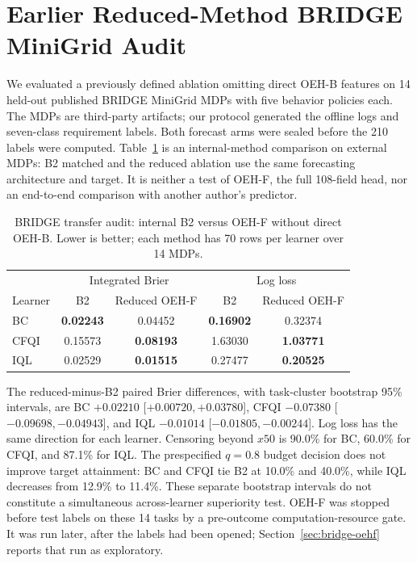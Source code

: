 \section{Earlier Reduced-Method BRIDGE MiniGrid Audit}
We evaluated a previously defined ablation omitting direct OEH-B features on 14 held-out published BRIDGE MiniGrid MDPs with five behavior policies each. The MDPs are third-party artifacts; our protocol generated the offline logs and seven-class requirement labels. Both forecast arms were sealed before the 210 labels were computed. Table~\ref{tab:bridge-reduced} is an internal-method comparison on external MDPs: B2 matched and the reduced ablation use the same forecasting architecture and target. It is neither a test of OEH-F, the full 108-field head, nor an end-to-end comparison with another author's predictor.

\begin{table}[h]
\centering
\caption{BRIDGE transfer audit: internal B2 versus OEH-F without direct OEH-B. Lower is better; each method has 70 rows per learner over 14 MDPs.}
\label{tab:bridge-reduced}
\begin{tabular}{lcccc}
\toprule
& \multicolumn{2}{c}{Integrated Brier} & \multicolumn{2}{c}{Log loss}\\
Learner & B2 & Reduced OEH-F & B2 & Reduced OEH-F\\
\midrule
BC & \textbf{0.02243} & 0.04452 & \textbf{0.16902} & 0.32374\\
CFQI & 0.15573 & \textbf{0.08193} & 1.63030 & \textbf{1.03771}\\
IQL & 0.02529 & \textbf{0.01515} & 0.27477 & \textbf{0.20525}\\
\bottomrule
\end{tabular}
\end{table}

The reduced-minus-B2 paired Brier differences, with task-cluster bootstrap 95\% intervals, are BC $+0.02210$ [$+0.00720,+0.03780$], CFQI $-0.07380$ [$-0.09698,-0.04943$], and IQL $-0.01014$ [$-0.01805,-0.00244$]. Log loss has the same direction for each learner. Censoring beyond $x50$ is 90.0\% for BC, 60.0\% for CFQI, and 87.1\% for IQL. The prespecified $q=0.8$ budget decision does not improve target attainment: BC and CFQI tie B2 at 10.0\% and 40.0\%, while IQL decreases from 12.9\% to 11.4\%. These separate bootstrap intervals do not constitute a simultaneous across-learner superiority test. OEH-F was stopped before test labels on these 14 tasks by a pre-outcome computation-resource gate. It was run later, after the labels had been opened; Section~\ref{sec:bridge-oehf} reports that run as exploratory.

